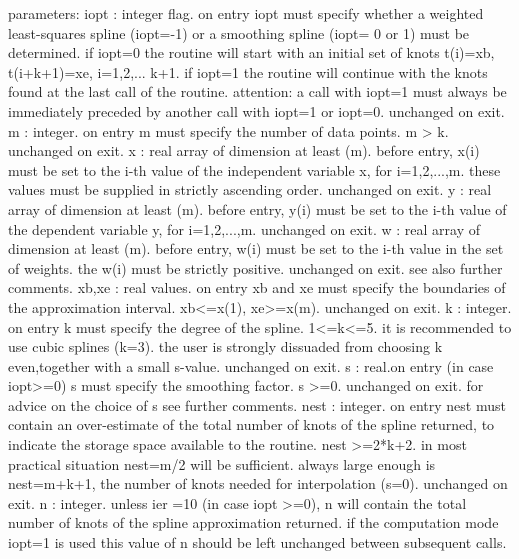 \documentclass[11pt,twoside,nolof]{starlink}
\begin{document}
\begin{terminalv}
  parameters:
   iopt  : integer flag. on entry iopt must specify whether a weighted
           least-squares spline (iopt=-1) or a smoothing spline (iopt=
           0 or 1) must be determined. if iopt=0 the routine will start
           with an initial set of knots t(i)=xb, t(i+k+1)=xe, i=1,2,...
           k+1. if iopt=1 the routine will continue with the knots
           found at the last call of the routine.
           attention: a call with iopt=1 must always be immediately
           preceded by another call with iopt=1 or iopt=0.
           unchanged on exit.
   m     : integer. on entry m must specify the number of data points.
           m > k. unchanged on exit.
   x     : real array of dimension at least (m). before entry, x(i)
           must be set to the i-th value of the independent variable x,
           for i=1,2,...,m. these values must be supplied in strictly
           ascending order. unchanged on exit.
   y     : real array of dimension at least (m). before entry, y(i)
           must be set to the i-th value of the dependent variable y,
           for i=1,2,...,m. unchanged on exit.
   w     : real array of dimension at least (m). before entry, w(i)
           must be set to the i-th value in the set of weights. the
           w(i) must be strictly positive. unchanged on exit.
           see also further comments.
   xb,xe : real values. on entry xb and xe must specify the boundaries
           of the approximation interval. xb<=x(1), xe>=x(m).
           unchanged on exit.
   k     : integer. on entry k must specify the degree of the spline.
           1<=k<=5. it is recommended to use cubic splines (k=3).
           the user is strongly dissuaded from choosing k even,together
           with a small s-value. unchanged on exit.
   s     : real.on entry (in case iopt>=0) s must specify the smoothing
           factor. s >=0. unchanged on exit.
           for advice on the choice of s see further comments.
   nest  : integer. on entry nest must contain an over-estimate of the
           total number of knots of the spline returned, to indicate
           the storage space available to the routine. nest >=2*k+2.
           in most practical situation nest=m/2 will be sufficient.
           always large enough is  nest=m+k+1, the number of knots
           needed for interpolation (s=0). unchanged on exit.
   n     : integer.
           unless ier =10 (in case iopt >=0), n will contain the
           total number of knots of the spline approximation returned.
           if the computation mode iopt=1 is used this value of n
           should be left unchanged between subsequent calls.

\end{terminalv}
\end{document}
